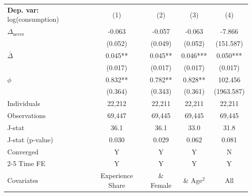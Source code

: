 \begin{tabular}{l cccc} \toprule  \textbf{Dep. var:}  log(consumption) 
                    &\multicolumn{1}{c}{(1)}   &\multicolumn{1}{c}{(2)}   &\multicolumn{1}{c}{(3)}   &\multicolumn{1}{c}{(4)}   \\

\addlinespace
$\Delta_{\text{never}}$&      -0.063   &      -0.057   &      -0.063   &      -7.866   \\
                    &     (0.052)   &     (0.049)   &     (0.052)   &   (151.587)   \\

\addlinespace
$\bar{\Delta}$      &       0.045** &       0.045** &       0.046***&       0.050***\\
                    &     (0.017)   &     (0.017)   &     (0.017)   &     (0.017)   \\

\addlinespace
$\phi$              &       0.832** &       0.782** &       0.828** &     102.456   \\
                    &     (0.364)   &     (0.343)   &     (0.361)   &  (1963.587)   \\
\addlinespace
Individuals         &      22,212   &      22,211   &      22,211   &      22,211   \\
Observations        &      69,447   &      69,445   &      69,445   &      69,445   \\
J-stat              &        36.1   &        36.1   &        33.0   &        31.8   \\
J-stat (p-value)    &       0.030   &       0.029   &       0.062   &       0.081   \\
Converged           &           Y   &           Y   &           Y   &           N   \\
\cmidrule{2-5} Time FE & Y & Y & Y & Y \\ Covariates & Experience Share & \& Female & \& Age$^2$ & All \\ \bottomrule \end{tabular}
